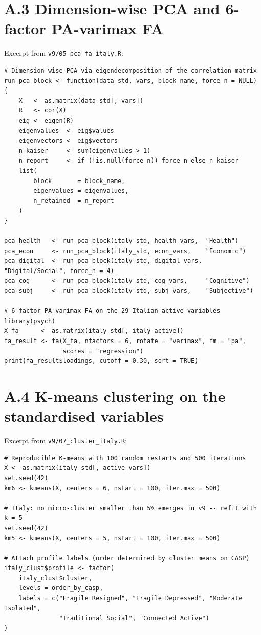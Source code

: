 \section{A.3\; Dimension-wise PCA and 6-factor PA-varimax FA}
\label{sec:appA-pca-fa}

Excerpt from \texttt{v9/05\_pca\_fa\_italy.R}:

\begin{lstlisting}[caption={PCA on each of the five conceptual dimensions, then joint FA on the full variable set.}]
# Dimension-wise PCA via eigendecomposition of the correlation matrix
run_pca_block <- function(data_std, vars, block_name, force_n = NULL) {
    X   <- as.matrix(data_std[, vars])
    R   <- cor(X)
    eig <- eigen(R)
    eigenvalues  <- eig$values
    eigenvectors <- eig$vectors
    n_kaiser     <- sum(eigenvalues > 1)
    n_report     <- if (!is.null(force_n)) force_n else n_kaiser
    list(
        block       = block_name,
        eigenvalues = eigenvalues,
        n_retained  = n_report
    )
}

pca_health   <- run_pca_block(italy_std, health_vars,  "Health")
pca_econ     <- run_pca_block(italy_std, econ_vars,    "Economic")
pca_digital  <- run_pca_block(italy_std, digital_vars, "Digital/Social", force_n = 4)
pca_cog      <- run_pca_block(italy_std, cog_vars,     "Cognitive")
pca_subj     <- run_pca_block(italy_std, subj_vars,    "Subjective")

# 6-factor PA-varimax FA on the 29 Italian active variables
library(psych)
X_fa      <- as.matrix(italy_std[, italy_active])
fa_result <- fa(X_fa, nfactors = 6, rotate = "varimax", fm = "pa",
                scores = "regression")
print(fa_result$loadings, cutoff = 0.30, sort = TRUE)
\end{lstlisting}

\section{A.4\; K-means clustering on the standardised variables}
\label{sec:appA-kmeans}

Excerpt from \texttt{v9/07\_cluster\_italy.R}:

\begin{lstlisting}[caption={K-means with one hundred random restarts on the 29 standardised Italian active variables.}]
# Reproducible K-means with 100 random restarts and 500 iterations
X <- as.matrix(italy_std[, active_vars])
set.seed(42)
km6 <- kmeans(X, centers = 6, nstart = 100, iter.max = 500)

# Italy: no micro-cluster smaller than 5% emerges in v9 -- refit with k = 5
set.seed(42)
km5 <- kmeans(X, centers = 5, nstart = 100, iter.max = 500)

# Attach profile labels (order determined by cluster means on CASP)
italy_clust$profile <- factor(
    italy_clust$cluster,
    levels = order_by_casp,
    labels = c("Fragile Resigned", "Fragile Depressed", "Moderate Isolated",
               "Traditional Social", "Connected Active")
)
\end{lstlisting}

